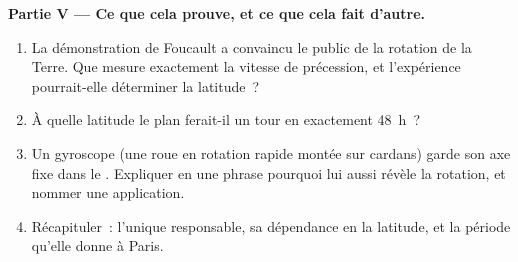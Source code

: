 \begin{problem}
\medskip
\noindent\textbf{Partie V --- Ce que cela prouve, et ce que cela fait d'autre.}
\begin{enumerate}[resume]
  \item La démonstration de Foucault a convaincu le public de la rotation
        de la Terre. Que mesure exactement la vitesse de précession, et
        l'expérience pourrait-elle déterminer la latitude~?
  \item À quelle latitude le plan ferait-il un tour en exactement \qty{48}{h}~?
  \item Un gyroscope (une roue en rotation rapide montée sur cardans)
        garde son axe fixe dans le . Expliquer en
        une phrase pourquoi lui aussi révèle la rotation, et nommer une
        application.
  \item Récapituler~: l'unique  responsable, sa dépendance
        en la latitude, et la période qu'elle donne à Paris.
\end{enumerate}
\end{problem}
